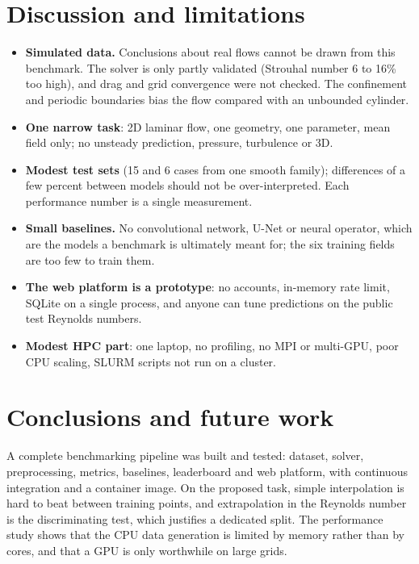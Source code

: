 \documentclass[11pt,a4paper]{article}
\begin{document}
\section{Discussion and limitations}\label{sec:limits}
\begin{itemize}
  \item \textbf{Simulated data.} Conclusions about real flows cannot be drawn from this benchmark. The solver is only partly validated (Strouhal number 6 to 16\% too high), and drag and grid convergence were not checked. The confinement and periodic boundaries bias the flow compared with an unbounded cylinder.
  \item \textbf{One narrow task}: 2D laminar flow, one geometry, one parameter, mean field only; no unsteady prediction, pressure, turbulence or 3D.
  \item \textbf{Modest test sets} (15 and 6 cases from one smooth family); differences of a few percent between models should not be over-interpreted. Each performance number is a single measurement.
  \item \textbf{Small baselines.} No convolutional network, U-Net or neural operator, which are the models a benchmark is ultimately meant for; the six training fields are too few to train them.
  \item \textbf{The web platform is a prototype}: no accounts, in-memory rate limit, SQLite on a single process, and anyone can tune predictions on the public test Reynolds numbers.
  \item \textbf{Modest HPC part}: one laptop, no profiling, no MPI or multi-GPU, poor CPU scaling, SLURM scripts not run on a cluster.
\end{itemize}

\section{Conclusions and future work}
A complete benchmarking pipeline was built and tested: dataset, solver, preprocessing, metrics, baselines, leaderboard and web platform, with continuous integration and a container image. On the proposed task, simple interpolation is hard to beat between training points, and extrapolation in the Reynolds number is the discriminating test, which justifies a dedicated split. The performance study shows that the CPU data generation is limited by memory rather than by cores, and that a GPU is only worthwhile on large grids.
\end{document}
